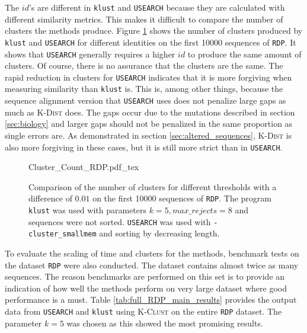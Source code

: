 The $id$'s are different in \texttt{klust} and \texttt{USEARCH} because they
are calculated with different similarity metrics. This makes it difficult to
compare the number of clusters the methods produce. Figure
\ref{fig:id_comparison} shows the number of clusters produced by
\texttt{klust} and \texttt{USEARCH} for different identities on the first
\num{10000} sequences of \texttt{RDP}. It shows that \texttt{USEARCH}
generally requires a higher $id$ to produce the same amount of clusters. Of
course, there is no assurance that the clusters are the same. The rapid
reduction in clusters for \texttt{USEARCH} indicates that it is more forgiving
when measuring similarity than \texttt{klust} is. This is, among other things,
because the sequence alignment version that \texttt{USEARCH} uses does not
penalize large gaps as much as \textsc{K-Dist} does. The gaps occur due to the
mutations described in section \ref{sec:biology} and larger gaps should not be
penalized in the same proportion as single errors are. As demonstrated in
section \ref{sec:altered_sequences}, \textsc{K-Dist} is also more forgiving in
these cases, but it is still more strict than in \texttt{USEARCH}.

\begin{figure}[H]
  \centering
  \def\svgwidth{\columnwidth}
  {Cluster_Count_RDP.pdf_tex}
  \caption{Comparison of the number of clusters for different thresholds with a difference of $0.01$ on the first \num{10000} sequences of \texttt{RDP}. The program \texttt{klust} was used with parameters $k=5, max\_rejects=8$ and sequences were not sorted. \texttt{USEARCH} was used with \texttt{-cluster\_smallmem} and sorting by decreasing length.}
  \label{fig:id_comparison}
\end{figure}

To evaluate the scaling of time and clusters for the methods, benchmark tests
on the dataset \texttt{RDP} were also conducted. The dataset contains almost
twice as many sequences. The reason benchmarks are performed on this set is to
provide an indication of how well the methods perform on very large dataset
where good performance is a must. Table \ref{tab:full_RDP_main_results}
provides the output data from \texttt{USEARCH} and \texttt{klust} using
\textsc{K-Clust} on the entire \texttt{RDP} dataset. The parameter $k=5$ was
chosen as this showed the most promising results.

